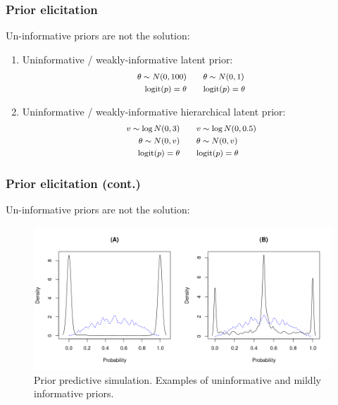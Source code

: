 \documentclass[arial,12pt,xcolor=dvipsnames]{beamer}
\begin{document}
\begin{frame}
	\frametitle{Prior elicitation}
	Un-informative priors are not the solution:
	\begin{enumerate}
		\item Uninformative / weakly-informative latent prior:
		\begin{equation*} \label{eq:prior_el1}
			\footnotesize
			\begin{split}	
				\theta \sim N(0, 100) \quad & \quad \theta \sim N(0, 1) \\
				\text{logit}(p) = \theta \quad & \quad \text{logit}(p) = \theta
			\end{split}
		\end{equation*}
		\item Uninformative / weakly-informative hierarchical latent prior:
		\begin{equation*} \label{eq:prior_el2}
			\footnotesize
			\begin{split}
				v \sim \log N(0, 3) \quad & \quad v \sim \log N(0, 0.5) \\	
				\theta \sim N(0, v) \quad & \quad \theta \sim N(0, v) \\
				\text{logit}(p) = \theta \quad & \quad \text{logit}(p) = \theta
			\end{split}
		\end{equation*}
	\end{enumerate}
\end{frame}
%
\begin{frame}
	\frametitle{Prior elicitation (cont.)}
	Un-informative priors are not the solution:
	\begin{figure}[!h]
		\centering
		\includegraphics[width=1\textwidth]{prior_elicitation}
		\caption{Prior predictive simulation. Examples of uninformative and mildly informative priors.}
		\label{fig:prior_elicitation}
	\end{figure}
\end{frame}
\end{document}
